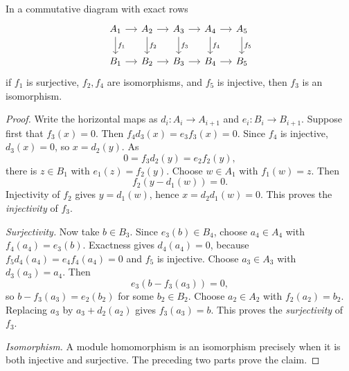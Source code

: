 \begin{theorem}\label{thm:five-lemma}
In a commutative diagram with exact rows
\[
\begin{tikzcd}[column sep=small]
A_1\arrow[r]\arrow[d,"f_1"]&A_2\arrow[r]\arrow[d,"f_2"]&A_3\arrow[r]\arrow[d,"f_3"]&A_4\arrow[r]\arrow[d,"f_4"]&A_5\arrow[d,"f_5"]\\
B_1\arrow[r]&B_2\arrow[r]&B_3\arrow[r]&B_4\arrow[r]&B_5
\end{tikzcd}
\]
if \(f_1\) is surjective, \(f_2,f_4\) are isomorphisms, and \(f_5\) is
injective, then \(f_3\) is an isomorphism.
\end{theorem}
\begin{proof}
Write the horizontal maps as \(d_i:A_i\to A_{i+1}\) and
\(e_i:B_i\to B_{i+1}\).  Suppose first that \(f_3(x)=0\).  Then
\(f_4d_3(x)=e_3f_3(x)=0\).  Since \(f_4\) is injective,
\(d_3(x)=0\), so \(x=d_2(y)\).  As
\[
0=f_3d_2(y)=e_2f_2(y),
\]
there is \(z\in B_1\) with \(e_1(z)=f_2(y)\).  Choose \(w\in A_1\) with
\(f_1(w)=z\).  Then
\[
f_2(y-d_1(w))=0.
\]
Injectivity of \(f_2\) gives \(y=d_1(w)\), hence \(x=d_2d_1(w)=0\).
This proves the \emph{injectivity} of \(f_3\).

\emph{Surjectivity.} Now take \(b\in B_3\).  Since \(e_3(b)\in B_4\), choose
\(a_4\in A_4\) with \(f_4(a_4)=e_3(b)\).  Exactness gives
\(d_4(a_4)=0\), because \(f_5d_4(a_4)=e_4f_4(a_4)=0\) and \(f_5\) is
injective.  Choose \(a_3\in A_3\) with \(d_3(a_3)=a_4\).  Then
\[
e_3(b-f_3(a_3))=0,
\]
so \(b-f_3(a_3)=e_2(b_2)\) for some \(b_2\in B_2\).  Choose
\(a_2\in A_2\) with \(f_2(a_2)=b_2\).  Replacing \(a_3\) by
\(a_3+d_2(a_2)\) gives \(f_3(a_3)=b\).  This proves the \emph{surjectivity}
of \(f_3\).

\emph{Isomorphism.} A module homomorphism is an isomorphism precisely when it
is both injective and surjective.  The preceding two parts prove the claim.
\end{proof}

